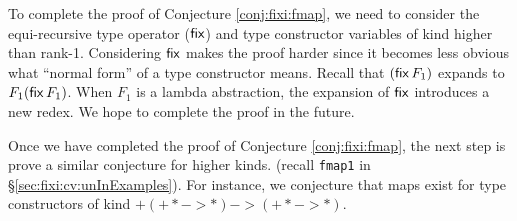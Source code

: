 To complete the proof of Conjecture \ref{conj:fixi:fmap}, we need to
consider the equi-recursive type operator ($\mathsf{fix}$) and type constructor
variables of kind higher than rank-1. Considering $\mathsf{fix}$ makes the proof harder
since it becomes less obvious what ``normal form'' of a type constructor means.
Recall that $(\mathsf{fix}\,F_1)$ expands to $F_1(\mathsf{fix}\,F_1)$.  When $F_1$ is
a lambda abstraction, the expansion of $\mathsf{fix}$ introduces a new redex.
We hope to complete the proof in the future.

Once we have completed the proof of Conjecture \ref{conj:fixi:fmap},
the next step is prove a similar conjecture for higher kinds.
(recall \texttt{fmap1} in \S\ref{sec:fixi:cv:unInExamples}).
For instance, we conjecture that maps exist for type constructors
of kind $+(+* -> *) -> (+* -> *)$.


